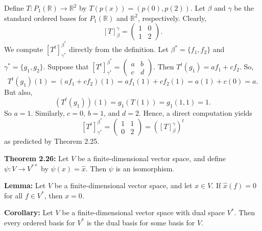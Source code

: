 \documentclass{report}
\begin{document}
        \begin{Example}
        Define \( T: P_1(\mathbb{R}) \rightarrow \mathbb{R}^2 \) by \( T(p(x)) = (p(0), p(2)) \). Let \( \beta \) and \( \gamma \) be the standard ordered bases for \( P_1(\mathbb{R}) \) and \( \mathbb{R}^2 \), respectively. Clearly,
        $$
        [T]_{\beta}^{\gamma} = \begin{pmatrix} 1 & 0 \\ 1 & 2 \end{pmatrix}.
        $$
        We compute \(\left[ T^t \right]_{\gamma^*}^{\beta^*}\) directly from the definition. Let \( \beta^* = \{f_1, f_2\} \) and \( \gamma^* = \{g_1, g_2\} \). Suppose that \(\left[ T^t \right]_{\gamma^*}^{\beta^*} = \begin{pmatrix} a & b \\ c & d \end{pmatrix} \). Then \( T^t(g_1) = a f_1 + c f_2 \). 
        So,
        $$
        T^t(g_1)(1) = (a f_1 + c f_2)(1) = a f_1(1) + c f_2(1) = a(1) + c(0) = a.
        $$
        But also,
        $$
        (T^t(g_1))(1) = g_1(T(1)) = g_1(1, 1) = 1.
        $$
        So \( a = 1 \). Similarly, \( c = 0 \), \( b = 1 \), and \( d = 2 \). Hence, a direct computation yields
        $$
        \left[ T^t \right]_{\gamma^*}^{\beta^*} = \begin{pmatrix} 1 & 1 \\ 0 & 2 \end{pmatrix} = \left( [T]_{\beta}^{\gamma} \right)^t
        $$
        as predicted by Theorem 2.25.
        \end{Example}
        
        
        \begin{thBox}
        \textbf{Theorem 2.26:} Let \( V \) be a finite-dimensional vector space, and define \( \psi: V \rightarrow V^{**} \) by \( \psi(x) = \widehat{x} \). Then \( \psi \) is an isomorphism.
        \end{thBox}
        
        \begin{thBox}
        \textbf{Lemma:} Let \( V \) be a finite-dimensional vector space, and let \( x \in V \). If \( \widehat{x}(f) = 0 \) for all \( f \in V^* \), then \( x = 0 \).
        \end{thBox}
        
        \begin{thBox}
        \textbf{Corollary:} Let \( V \) be a finite-dimensional vector space with dual space \( V^* \). Then every ordered basis for \( V^* \) is the dual basis for some basis for \( V \).
        \end{thBox}
        
\end{document}
